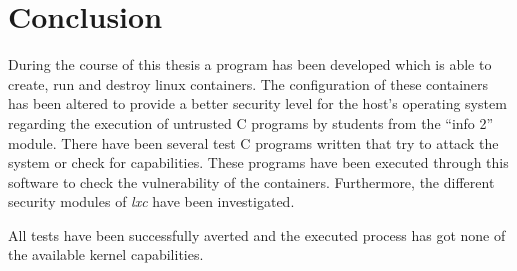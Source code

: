 \chapter{Conclusion}

During the course of this thesis a program has been developed which is able to
create, run and destroy linux containers. The configuration of these containers
has been altered to provide a better security level for the host's operating system
regarding the execution of untrusted C programs by students from the ``info 2'' module.
There have been several test C programs written that try to attack the system or
check for capabilities. These programs have been executed through this software to
check the vulnerability of the containers.
Furthermore, the different security modules of \textit{lxc} have been investigated.

All tests have been successfully averted and the executed process has got none of the
available kernel capabilities.
